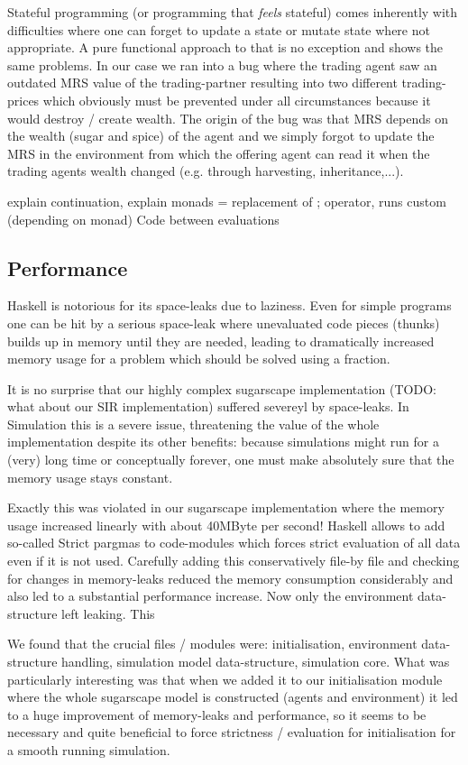 Stateful programming (or programming that \textit{feels} stateful) comes inherently with difficulties where one can forget to update a state or mutate state where not appropriate. A pure functional approach to that is no exception and shows the same problems. In our case we ran into a bug where the trading agent saw an outdated MRS value of the trading-partner resulting into two different trading-prices which obviously must be prevented under all circumstances because it would destroy / create wealth. The origin of the bug was that MRS depends on the wealth (sugar and spice) of the agent and we simply forgot to update the MRS in the environment from which the offering agent can read it when the trading agents wealth changed (e.g. through harvesting, inheritance,...).

explain continuation, explain monads = replacement of ; operator, runs custom (depending on monad) Code between evaluations

\subsection{Performance}
Haskell is notorious for its space-leaks due to laziness. Even for simple programs one can be hit by a serious space-leak where unevaluated code pieces (thunks) builds up in memory until they are needed, leading to dramatically increased memory usage for a problem which should be solved using a fraction.

It is no surprise that our highly complex sugarscape implementation (TODO: what about our SIR implementation) suffered severeyl by space-leaks. In Simulation this is a severe issue, threatening the value of the whole implementation despite its other benefits: because simulations might run for a (very) long time or conceptually forever, one must make absolutely sure that the memory usage stays constant.

Exactly this was violated in our sugarscape implementation where the memory usage increased linearly with about 40MByte per second! 
Haskell allows to add so-called Strict pargmas to code-modules which forces strict evaluation of all data even if it is not used. Carefully adding this conservatively file-by file and checking for changes in memory-leaks reduced the memory consumption considerably and also led to a substantial performance increase. Now only the environment data-structure left leaking. This 

We found that the crucial files / modules were: initialisation, environment data-structure handling, simulation model data-structure, simulation core. What was particularly interesting was that when we added it to our initialisation module where the whole sugarscape model is constructed (agents and environment) it led to a huge improvement of memory-leaks and performance, so it seems to be necessary and quite beneficial to force strictness / evaluation for initialisation for a smooth running simulation.


